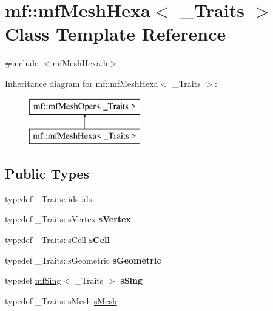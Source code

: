\hypertarget{classmf_1_1mfMeshHexa}{
\section{mf::mfMeshHexa$<$ \_\-Traits $>$ Class Template Reference}
\label{classmf_1_1mfMeshHexa}
}


{\ttfamily \#include $<$mfMeshHexa.h$>$}

Inheritance diagram for mf::mfMeshHexa$<$ \_\-Traits $>$:\begin{figure}[H]
\begin{center}
\leavevmode
\includegraphics[height=2.000000cm]{classmf_1_1mfMeshHexa}
\end{center}
\end{figure}
\subsection*{Public Types}
\begin{DoxyCompactItemize}
\item 
typedef \_\-Traits::ids \hyperlink{classmf_1_1mfMeshHexa_ab95eac5745c5efd075cf732421c40d94}{ids}
\item 
\hypertarget{classmf_1_1mfMeshHexa_a079b3030e947801ec2ae45637db567ad}{
typedef \_\-Traits::sVertex {\bfseries sVertex}}
\label{classmf_1_1mfMeshHexa_a079b3030e947801ec2ae45637db567ad}

\item 
\hypertarget{classmf_1_1mfMeshHexa_a2788d6dc9ab468e6d363b1e8395eb615}{
typedef \_\-Traits::sCell {\bfseries sCell}}
\label{classmf_1_1mfMeshHexa_a2788d6dc9ab468e6d363b1e8395eb615}

\item 
\hypertarget{classmf_1_1mfMeshHexa_adf835487b92643f0bb47b232a301a440}{
typedef \_\-Traits::sGeometric {\bfseries sGeometric}}
\label{classmf_1_1mfMeshHexa_adf835487b92643f0bb47b232a301a440}

\item 
\hypertarget{classmf_1_1mfMeshHexa_aef7339b0da506d763cc113da810987ba}{
typedef \hyperlink{classmf_1_1mfSing}{mfSing}$<$ \_\-Traits $>$ {\bfseries sSing}}
\label{classmf_1_1mfMeshHexa_aef7339b0da506d763cc113da810987ba}

\item 
typedef \_\-Traits::sMesh \hyperlink{classmf_1_1mfMeshHexa_adc5f7c62030d948caf1f04a255f385de}{sMesh}
\end{DoxyCompactItemize}

